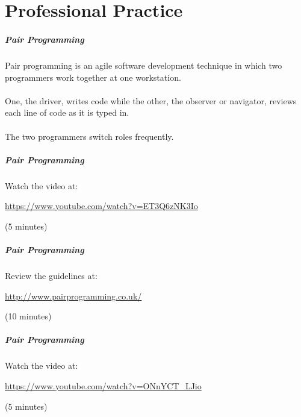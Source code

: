 
\part{Professional Practice}
\frame{\partpage}

\begin{frame}
	\frametitle{Pair Programming}
		
	Pair programming is an agile software development technique in which two programmers work together 
	at one workstation. 
	\\~\\
	One, the driver, writes code while the other, the observer or navigator, reviews 
	each line of code as it is typed in. 
	\\~\\
	The two programmers switch roles frequently.
	
\end{frame}

\begin{frame}
	\frametitle{Pair Programming}
	
	Watch the video at:
	
	\vspace{1.5em}
		
	\url{https://www.youtube.com/watch?v=ET3Q6zNK3Io}
	
	\vspace{1em}
		
	(5 minutes)
	
\end{frame}

\begin{frame}
	\frametitle{Pair Programming}
	
	Review the guidelines at:
	
	\vspace{1.5em}
		
	\url{http://www.pairprogramming.co.uk/}
	
	\vspace{1em}
		
	(10 minutes)
	
\end{frame}

\begin{frame}
	\frametitle{Pair Programming}
	
	Watch the video at:
	
	\vspace{1.5em}
		
	\url{https://www.youtube.com/watch?v=ONnYCT_LJio}
	
	\vspace{1em}
		
	(5 minutes)
	
\end{frame}

